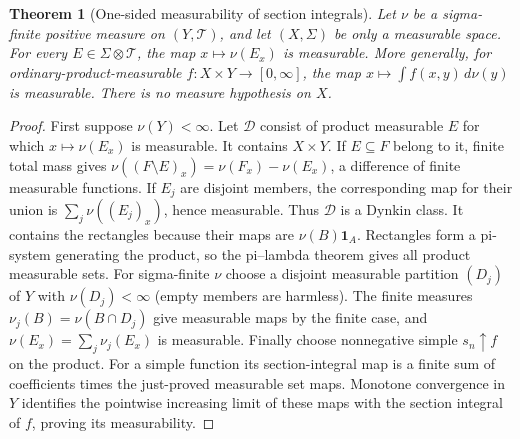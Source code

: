 \documentclass[11pt,oneside,openany]{book}
\newtheorem{theorem}{Theorem}[chapter]
\theoremstyle{definition}
\theoremstyle{remark}
\newcommand{\one}{\mathbf1}\newcommand{\ind}[1]{\mathbf1_{#1}}
\newcommand{\Eplus}{[0,\infty]}
\newcommand{\family}[1]{}
\begin{document}
\begin{theorem}[One-sided measurability of section integrals]
\family{D11.08.section_integrals_one_sided}\label{d11:08:section-integrals-one-sided}
Let $\nu$ be a sigma-finite positive measure on $(Y,\mathcal T)$, and
let $(X,\Sigma)$ be only a measurable space. For every
$E\in\Sigma\otimes\mathcal T$, the map $x\mapsto\nu(E_x)$ is measurable.
More generally, for ordinary-product-measurable $f:X\times Y\to\Eplus$,
the map $x\mapsto\int f(x,y)\,d\nu(y)$ is measurable. There is no measure
hypothesis on $X$.
\end{theorem}
\begin{proof}
First suppose $\nu(Y)<\infty$. Let $\mathcal D$ consist of product
measurable $E$ for which $x\mapsto\nu(E_x)$ is measurable. It contains
$X\times Y$. If $E\subseteq F$ belong to it, finite total mass gives
$\nu((F\setminus E)_x)=\nu(F_x)-\nu(E_x)$, a difference of finite
measurable functions. If $E_j$ are disjoint members, the corresponding
map for their union is $\sum_j\nu((E_j)_x)$, hence measurable.
Thus $\mathcal D$ is a Dynkin class. It contains the rectangles because
their maps are $\nu(B)\one_A$. Rectangles form a pi-system generating the
product, so the pi--lambda theorem gives all product measurable sets.
For sigma-finite $\nu$ choose a disjoint measurable partition $(D_j)$ of
$Y$ with $\nu(D_j)<\infty$ (empty members are harmless). The finite
measures $\nu_j(B)=\nu(B\cap D_j)$ give measurable maps by the finite
case, and $\nu(E_x)=\sum_j\nu_j(E_x)$ is measurable.
Finally choose nonnegative simple $s_n\uparrow f$ on the product.
For a simple function its section-integral map is a finite sum of
coefficients times the just-proved measurable set maps. Monotone
convergence in $Y$ identifies the pointwise increasing limit of these
maps with the section integral of $f$, proving its measurability.
\end{proof}
\end{document}
